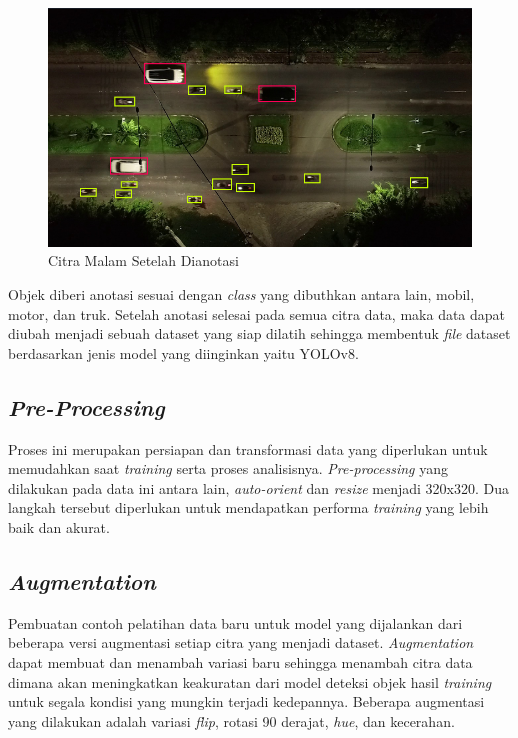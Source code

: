 \begin{figure} [H] \centering
  \includegraphics[scale=0.5]{bab3/anotasidatamalam.png}
  \caption{Citra Malam Setelah Dianotasi}
  \label{fig:anotasidatamalam}
\end{figure}

Objek diberi anotasi sesuai dengan \emph{class} yang dibuthkan antara lain, mobil, motor, dan truk. Setelah anotasi selesai pada semua citra data, maka data dapat diubah menjadi sebuah dataset yang siap dilatih sehingga membentuk \emph{file} dataset berdasarkan jenis model yang diinginkan yaitu YOLOv8.

\subsection{\emph{Pre-Processing}}
Proses ini merupakan persiapan dan transformasi data yang diperlukan untuk memudahkan saat \emph{training} serta proses analisisnya. \emph{Pre-processing} yang dilakukan pada data ini antara lain, \emph{auto-orient} dan \emph{resize} menjadi 320x320. Dua langkah tersebut diperlukan untuk mendapatkan performa \emph{training} yang lebih baik dan akurat.

\subsection{\emph{Augmentation}}
Pembuatan contoh pelatihan data baru untuk model yang dijalankan dari beberapa versi augmentasi setiap citra yang menjadi dataset. \emph{Augmentation} dapat membuat dan menambah variasi baru sehingga menambah citra data dimana akan meningkatkan keakuratan dari model deteksi objek hasil \emph{training} untuk segala kondisi yang mungkin terjadi kedepannya. Beberapa augmentasi yang dilakukan adalah variasi \emph{flip}, rotasi 90 derajat, \emph{hue}, dan kecerahan.

